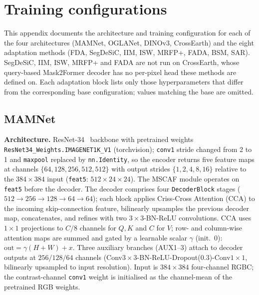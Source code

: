 \section{Training configurations}
\label{app:training}

This appendix documents the architecture and training configuration for
each of the four architectures (MAMNet, OGLANet, DINOv3, CrossEarth)
and the eight adaptation methods (FDA, SegDeSiC, IIM, ISW, MRFP+, FADA,
BSM, SAR).  SegDeSiC, IIM, ISW, MRFP+ and FADA are not run on
CrossEarth, whose query-based Mask2Former decoder has no per-pixel head
these methods are defined on.  Each adaptation block lists only those
hyperparameters that differ from the corresponding base configuration;
values matching the base are omitted.  

\subsection{MAMNet}
\label{sec:mamnet-base}

\textbf{Architecture.}
ResNet-34~\cite{he2016deep} backbone with pretrained weights
\texttt{ResNet34\_Weights.IMAGENET1K\_V1} (torchvision); \texttt{conv1}
stride changed from 2 to 1 and \texttt{maxpool} replaced by
\texttt{nn.Identity}, so the encoder returns five feature maps at
channels $\{64,128,256,512,512\}$ with output strides
$\{1,2,4,8,16\}$ relative to the $384\times384$ input
(\texttt{feat5}: $512{\times}24{\times}24$).
The MSCAF module operates on \texttt{feat5} before the decoder.
The decoder comprises four \texttt{DecoderBlock} stages
($512{\to}256{\to}128{\to}64{\to}64$); each block applies Criss-Cross
Attention (CCA) to the incoming skip-connection feature, bilinearly
upsamples the previous decoder map, concatenates, and refines with
two $3{\times}3$-BN-ReLU convolutions.  CCA uses $1{\times}1$
projections to $C/8$ channels for $Q,K$ and $C$ for $V$; row- and
column-wise attention maps are summed and gated by a learnable scalar
$\gamma$ (init.\ 0): $\text{out} = \gamma(H{+}W) + x$.  Three
auxiliary branches (AUX1--3) attach to decoder outputs at $256/128/64$
channels (Conv$3{\times}3$-BN-ReLU-Dropout(0.3)-Conv$1{\times}1$,
bilinearly upsampled to input resolution).
Input is $384{\times}384$ four-channel RGBC; the contrast-channel
\texttt{conv1} weight is initialised as the channel-mean of the
pretrained RGB weights.

